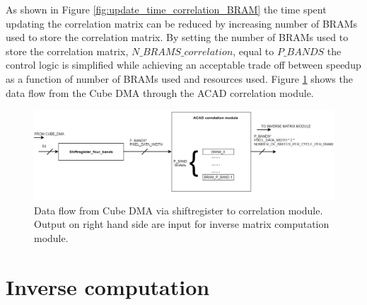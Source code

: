 As shown in Figure \ref{fig:update_time_correlation_BRAM} the time spent updating the correlation matrix can be reduced by increasing number of BRAMs used to store the correlation matrix. By setting the  number of BRAMs used to store the correlation matrix, $N\_BRAMS\_correlation$, equal to $P\_BANDS$ the control logic is simplified while achieving an acceptable trade off between speedup as a function of number of BRAMs used and resources used. Figure \ref{fig:data_flow_cube_dma_to_inverse} shows the data flow from the Cube DMA through the ACAD correlation module. 


\begin{figure}[H]
\centering
   \includegraphics[scale=0.5]{images/data_flow_cube_dma_to_inverse_module.PNG}
  \caption{Data flow from Cube DMA via shiftregister to correlation module. Output on right hand side are input for inverse matrix computation module.  } 
  \label{fig:data_flow_cube_dma_to_inverse}
\end{figure}


\section{Inverse computation}
\label{sec:inverse_computation_hw}
